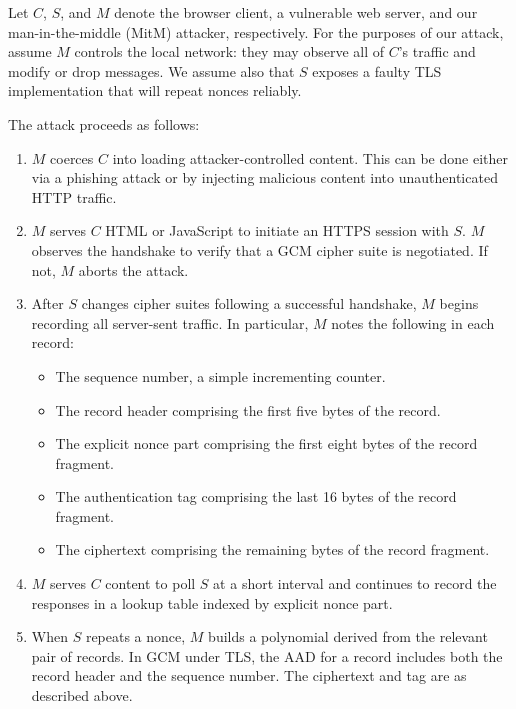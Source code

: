 Let $C$, $S$, and $M$ denote the browser client, a vulnerable web server, and our man-in-the-middle (MitM) attacker, respectively. For the purposes of our attack, assume $M$ controls the local network: they may observe all of $C$'s traffic and modify or drop messages. We assume also that $S$ exposes a faulty TLS implementation that will repeat nonces reliably.

The attack proceeds as follows:

\begin{enumerate}

\item $M$ coerces $C$ into loading attacker-controlled content. This can be done either via a phishing attack or by injecting malicious content into unauthenticated HTTP traffic.

\item $M$ serves $C$ HTML or JavaScript to initiate an HTTPS session with $S$. $M$ observes the handshake to verify that a GCM cipher suite is negotiated. If not, $M$ aborts the attack.

\item After $S$ changes cipher suites following a successful handshake, $M$ begins recording all server-sent traffic. In particular, $M$ notes the following in each record:

  \begin{itemize}
  \item The sequence number, a simple incrementing counter.
  \item The record header comprising the first five bytes of the record.
  \item The explicit nonce part comprising the first eight bytes of the record fragment.
  \item The authentication tag comprising the last 16 bytes of the record fragment.
  \item The ciphertext comprising the remaining bytes of the record fragment.
  \end{itemize}

\item $M$ serves $C$ content to poll $S$ at a short interval and continues to record the responses in a lookup table indexed by explicit nonce part.\label{itm:poll}

\item When $S$ repeats a nonce, $M$ builds a polynomial derived from the relevant pair of records. In GCM under TLS, the AAD for a record includes both the record header and the sequence number. The ciphertext and tag are as described above.


\end{enumerate}
